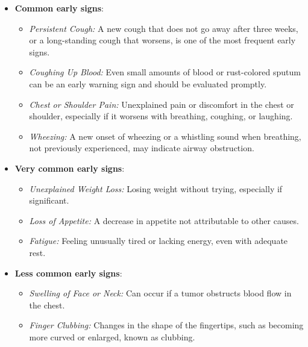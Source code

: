 \begin{itemize}
    \item \textbf{Common early signs}: 
        \begin{itemize}
            \item \textit{Persistent Cough:} A new cough that does not go away after three weeks, 
            or a long-standing cough that worsens, is one of the most frequent early signs.

            \item \textit{Coughing Up Blood:} Even small amounts of blood or rust-colored sputum 
            can be an early warning sign and should be evaluated promptly.
    
            \item \textit{Chest or Shoulder Pain:} Unexplained pain or discomfort in the chest or 
            shoulder, especially if it worsens with breathing, coughing, or laughing.
        
            \item \textit{Wheezing:} A new onset of wheezing or a whistling sound when breathing, 
            not previously experienced, may indicate airway obstruction.
        \end{itemize}
    \newpage
    \item \textbf{Very common early signs}:
        \begin{itemize}
            \item \textit{Unexplained Weight Loss:} Losing weight without trying, especially if 
            significant.

            \item \textit{Loss of Appetite:} A decrease in appetite not attributable to other 
            causes.
    
            \item \textit{Fatigue:} Feeling unusually tired or lacking energy, even with adequate 
            rest.
        \end{itemize}
    \item \textbf{Less common early signs}:
        \begin{itemize}
            \item \textit{Swelling of Face or Neck:} Can occur if a tumor obstructs blood flow in 
            the chest.

            \item \textit{Finger Clubbing:} Changes in the shape of the fingertips, such as 
            becoming more curved or enlarged, known as clubbing.
        \end{itemize}
\end{itemize}

